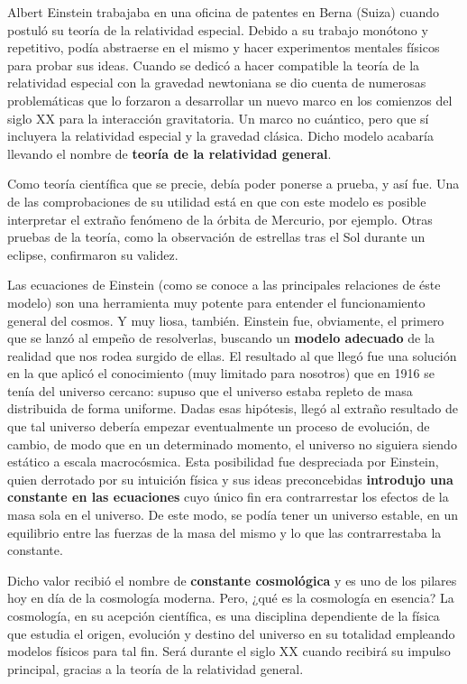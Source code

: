 \documentclass[11pt,a4paper,titlepage]{article}
\begin{document}
Albert Einstein trabajaba en una oficina de patentes en Berna (Suiza) cuando postuló su teoría de la relatividad especial. Debido a su trabajo monótono y repetitivo, podía abstraerse en el mismo y hacer experimentos mentales físicos para probar sus ideas. Cuando se dedicó a hacer compatible la teoría de la relatividad especial con la gravedad newtoniana se dio cuenta de numerosas problemáticas que lo forzaron a desarrollar un nuevo marco en los comienzos del siglo XX para la interacción gravitatoria. Un marco no cuántico, pero que sí incluyera la relatividad especial y la gravedad clásica. Dicho modelo acabaría llevando el nombre de \textbf{teoría de la relatividad general}.

Como teoría científica que se precie, debía poder ponerse a prueba, y así fue. Una de las comprobaciones de su utilidad está en que con este modelo es posible interpretar el extraño fenómeno de la órbita de Mercurio, por ejemplo. Otras pruebas de la teoría, como la observación de estrellas tras el Sol durante un eclipse, confirmaron su validez.


Las ecuaciones de Einstein (como se conoce a las principales relaciones de éste modelo) son una herramienta muy potente para entender el funcionamiento general del cosmos. Y muy liosa, también. Einstein fue, obviamente, el primero que se lanzó al empeño de resolverlas, buscando un \textbf{modelo adecuado} de la realidad que nos rodea surgido de ellas. El resultado al que llegó fue una solución en la que aplicó el conocimiento (muy limitado para nosotros) que en 1916 se tenía del universo cercano: supuso que el universo estaba repleto de masa distribuida de forma uniforme. Dadas esas hipótesis, llegó al extraño resultado de que tal universo debería empezar eventualmente un proceso de evolución, de cambio, de modo que en un determinado momento, el universo no siguiera siendo estático a escala macrocósmica. Esta posibilidad fue despreciada por Einstein, quien derrotado por su intuición física y sus ideas preconcebidas \textbf{introdujo una constante en las ecuaciones} cuyo único fin era contrarrestar los efectos de la masa sola en el universo. De este modo, se podía tener un universo estable, en un equilibrio entre las fuerzas de la masa del mismo y lo que las contrarrestaba la constante.

Dicho valor recibió el nombre de \textbf{constante cosmológica} y es uno de los pilares hoy en día de la cosmología moderna. Pero, ¿qué es la cosmología en esencia? La cosmología, en su acepción científica, es una disciplina dependiente de la física que estudia el origen, evolución y destino del universo en su totalidad empleando modelos físicos para tal fin. Será durante el siglo XX cuando recibirá su impulso principal, gracias a la teoría de la relatividad general.
\end{document}
